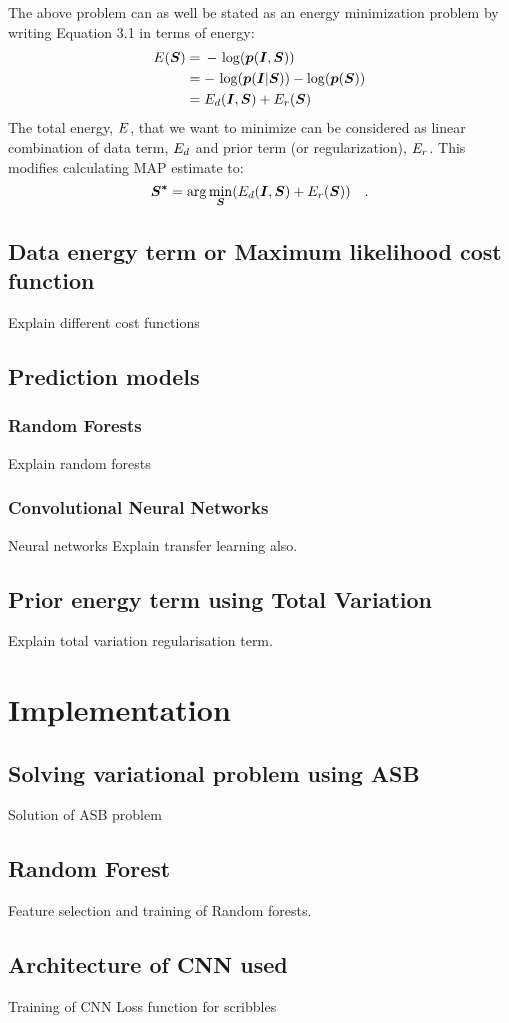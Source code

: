 The above problem can as well be stated as an energy minimization problem by
writing Equation 3.1 in terms of energy:
\begin{align*}
\mathop{{}E}(\boldsymbol{S}) &=\, - \, \log(\boldsymbol{p}(\boldsymbol{I}, \boldsymbol{S})) \\
&= -\, \log(\boldsymbol{p}(\boldsymbol{I}|\boldsymbol{S})) - \log(\boldsymbol{p}(\boldsymbol{S})) \\
&= \mathop{{}E_d}(\boldsymbol{I}, \boldsymbol{S}) + \mathop{{}E_r} (\boldsymbol{S})
\end{align*}
The total energy, $\mathop{{}E}$, that we want to minimize can be considered as linear combination of data term, $\mathop{{}E_d}$ and prior term (or regularization), $\mathop{{}E_r}$. This modifies calculating MAP estimate to:
\begin{equation*}
\boldsymbol{S^*} = \arg\min_{\boldsymbol{S}}({\mathop{{}E_d}(\boldsymbol{I}, \boldsymbol{S}) + \mathop{{}E_r} (\boldsymbol{S})}) \quad .
\end{equation*}

\section{Data energy term or Maximum likelihood cost function}
Explain different cost functions

\section{Prediction models}
\subsection{Random Forests}
Explain random forests
\subsection{Convolutional Neural Networks}
Neural networks \newline
Explain transfer learning also.

\section{Prior energy term using Total Variation}
Explain total variation regularisation term.


\chapter{Implementation}
\section{Solving variational problem using ASB}
Solution of ASB problem
\section{Random Forest}
Feature selection and training of Random forests.
\section{Architecture of CNN used}
Training of CNN \newline
Loss function for scribbles
